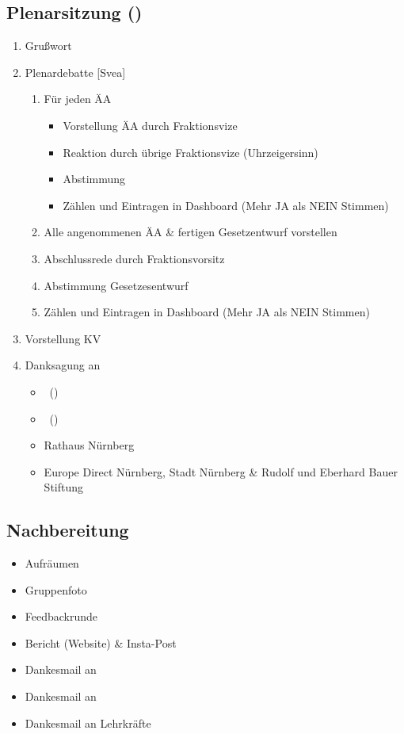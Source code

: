 \documentclass{article}
\newcommand{\EP}{Svea}
\newcommand{\EP}{Vincent}
\newcommand{\VERANSTALTUNGSORT}{Rathaus Nürnberg}%
\newcommand{\FOERDERER}{Europe Direct Nürnberg, Stadt Nürnberg \& Rudolf und Eberhard Bauer Stiftung}%
\newcommand{\VERANSTALTUNGSORT}{Rathaus Nürnberg}%
\newcommand{\FOERDERER}{Europe Direct Nürnberg, Stadt Nürnberg \& Rudolf und Eberhard Bauer Stiftung}%
\newcommand{\VERANSTALTUNGSORT}{Landtag Bayern}%
\newcommand{\FOERDERER}{Europe Direct München, Stadt München \& Landtag Bayern}%
\begin{document}
	\subsection{Plenarsitzung (\timePlenar)}
	\begin{enumerate}
		\item Grußwort \newline
        [\stadtvertreter]
		\item Plenardebatte [\EP]
		\begin{enumerate}
			\item Für jeden ÄA
			\begin{itemize}
				\item Vorstellung ÄA durch Fraktionsvize
				\item Reaktion durch übrige Fraktionsvize (Uhrzeigersinn)
				\item Abstimmung
				\item Zählen und Eintragen in Dashboard \newline (Mehr JA als NEIN Stimmen)
			\end{itemize}
			\item Alle angenommenen ÄA \& fertigen Gesetzentwurf vorstellen
			\item Abschlussrede durch Fraktionsvorsitz
			\item Abstimmung Gesetzesentwurf
			\item Zählen und Eintragen in Dashboard (Mehr JA als NEIN Stimmen)
		\end{enumerate}
		\item Vorstellung KV
		\item Danksagung an
		\begin{itemize}
            \item \stadtvertreter\ (\stadtvertreterOffice)
			\item \politiker\ (\politikerOffice)
			\item \VERANSTALTUNGSORT
			\item \FOERDERER
		\end{itemize}
	\end{enumerate}
	
	\subsection{Nachbereitung}
	\begin{itemize}
		\item Aufräumen
		\item Gruppenfoto
		\item Feedbackrunde
		\item Bericht (Website) \& Insta-Post
		\item Dankesmail an \stadtvertreter
		\item Dankesmail an \politiker
		\item Dankesmail an Lehrkräfte
	\end{itemize}
    \newpage
\end{document}
